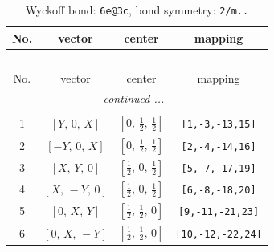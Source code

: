 \documentclass[fleqn,8pt]{jsarticle}
\begin{document}
\renewcommand{\arraystretch}{1.2}
\begin{longtable}{cccc}
\caption{Wyckoff bond: {\tt 6e@3c}, bond symmetry: {\tt 2/m..}}
 \\
 \hline \hline
No. & vector & center & mapping \\ \hline \endfirsthead

\multicolumn{3}{l}{\tablename\ \thetable{}} \\
 \hline \hline
No. & vector & center & mapping \\ \hline \endhead

 \hline \hline
\multicolumn{3}{r}{\footnotesize\it continued ...} \\ \endfoot

 \hline \hline
\multicolumn{3}{r}{} \\ \endlastfoot

1 & $\left[ Y,\, 0,\, X \right]$ & $\left[ 0,\, \frac{1}{2},\, \frac{1}{2} \right]$ & {\tt [1,-3,-13,15]} \\ \hline
2 & $\left[ - Y,\, 0,\, X \right]$ & $\left[ 0,\, \frac{1}{2},\, \frac{1}{2} \right]$ & {\tt [2,-4,-14,16]} \\ \hline
3 & $\left[ X,\, Y,\, 0 \right]$ & $\left[ \frac{1}{2},\, 0,\, \frac{1}{2} \right]$ & {\tt [5,-7,-17,19]} \\ \hline
4 & $\left[ X,\, - Y,\, 0 \right]$ & $\left[ \frac{1}{2},\, 0,\, \frac{1}{2} \right]$ & {\tt [6,-8,-18,20]} \\ \hline
5 & $\left[ 0,\, X,\, Y \right]$ & $\left[ \frac{1}{2},\, \frac{1}{2},\, 0 \right]$ & {\tt [9,-11,-21,23]} \\ \hline
6 & $\left[ 0,\, X,\, - Y \right]$ & $\left[ \frac{1}{2},\, \frac{1}{2},\, 0 \right]$ & {\tt [10,-12,-22,24]} \\
\end{longtable}
\renewcommand{\arraystretch}{1.2}
\end{document}
